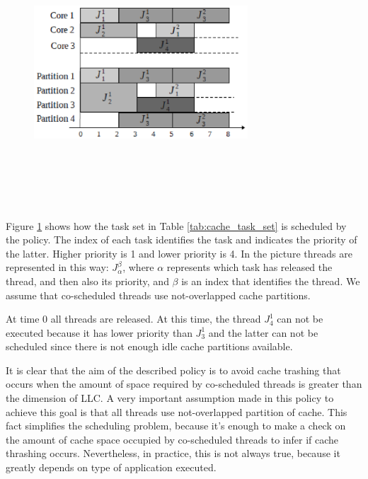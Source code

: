 \begin{description}
\begin{figure}[htbp]
\centering
{
\includegraphics[width=8cm,height=10cm, keepaspectratio]{images/schedule.eps}
}
\caption{}
\label{fig:sched_example}
\end{figure}

Figure \ref{fig:sched_example} shows how the task set in Table \ref{tab:cache_task_set} is scheduled by the policy. The index of each task 
identifies the task and indicates the priority of the latter. Higher priority is 1 and lower priority is 4. In the picture threads are represented in this 
way: $J_{\alpha}^\beta$, where $\alpha$ represents which task has released the thread, and then also its priority, and $\beta$ is an index that identifies 
the thread. We assume that co-scheduled threads use not-overlapped cache partitions.

At time 0 all threads are released. At this time, the thread $J_{4}^1$ can not be executed because it has lower priority than $J_{3}^1$ and the latter can 
not be scheduled since there is not enough idle cache partitions available.

It is clear that the aim of the described policy is to avoid cache trashing that occurs when the amount of space required by co-scheduled threads is greater 
than the dimension of LLC. A very important assumption made in this policy to achieve this goal is that all threads use not-overlapped 
partition of cache. This fact simplifies the scheduling problem, because it's enough to make a check on the amount of cache space occupied by co-scheduled 
threads to infer if cache thrashing occurs. Nevertheless, in practice, this is not always true, because it greatly depends on type of application executed.



\end{description}
